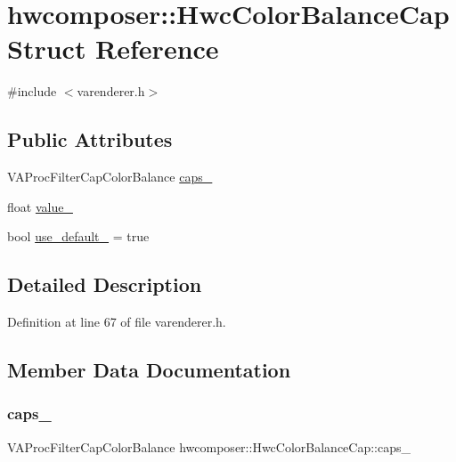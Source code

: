 \hypertarget{structhwcomposer_1_1HwcColorBalanceCap}{}\section{hwcomposer\+:\+:Hwc\+Color\+Balance\+Cap Struct Reference}
\label{structhwcomposer_1_1HwcColorBalanceCap}


{\ttfamily \#include $<$varenderer.\+h$>$}

\subsection*{Public Attributes}
\begin{DoxyCompactItemize}
\item 
V\+A\+Proc\+Filter\+Cap\+Color\+Balance \mbox{\hyperlink{structhwcomposer_1_1HwcColorBalanceCap_aa30a2c4929e1994c25d3611dd209a1bd}{caps\+\_\+}}
\item 
float \mbox{\hyperlink{structhwcomposer_1_1HwcColorBalanceCap_a1f01561c63da1f130bb07682ae9fec34}{value\+\_\+}}
\item 
bool \mbox{\hyperlink{structhwcomposer_1_1HwcColorBalanceCap_a6f1a302a943743d07f51a79da718c646}{use\+\_\+default\+\_\+}} = true
\end{DoxyCompactItemize}


\subsection{Detailed Description}


Definition at line 67 of file varenderer.\+h.



\subsection{Member Data Documentation}
\mbox{\label{structhwcomposer_1_1HwcColorBalanceCap_aa30a2c4929e1994c25d3611dd209a1bd}} 
\subsubsection{\texorpdfstring{caps\+\_\+}{caps\_}}
{\footnotesize\ttfamily V\+A\+Proc\+Filter\+Cap\+Color\+Balance hwcomposer\+::\+Hwc\+Color\+Balance\+Cap\+::caps\+\_\+}



